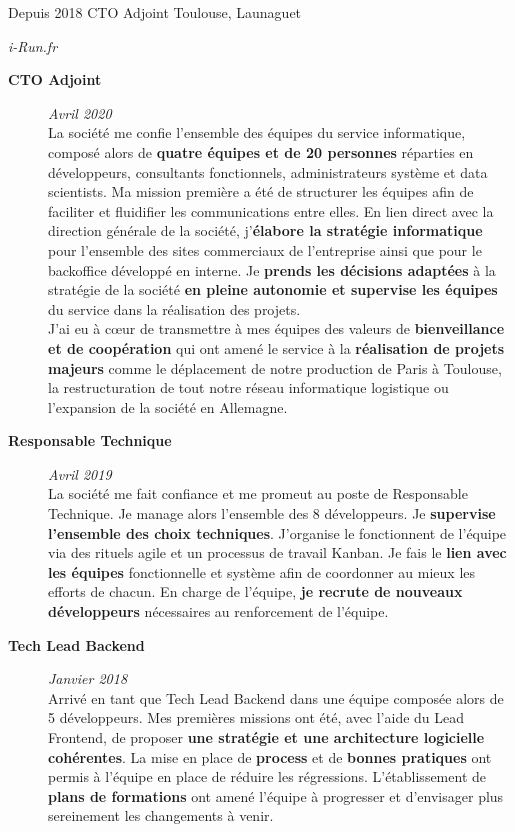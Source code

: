 \documentclass{friggeri-cv} 	%
\begin{document}
\begin{entrylist}
\entry
{Depuis 2018}
{CTO Adjoint}
{Toulouse, Launaguet}
{\vspace{-0.2cm}\emph{i-Run.fr} \\

\begin{description}
    \item [\bodyfont{|} \normalfont \textbf{\color{orange}CTO \color{headercolor}Adjoint}] \hfill \textit{Avril 2020}\\
    La société me confie l’ensemble des équipes du service informatique, composé alors de \textbf{quatre équipes et de 20 personnes} réparties en développeurs, consultants fonctionnels, administrateurs système et data scientists. Ma mission première a été de structurer les équipes afin de faciliter et fluidifier les communications entre elles. En lien direct avec la direction générale de la société, j’\textbf{élabore la stratégie informatique} pour l’ensemble des sites commerciaux de l’entreprise ainsi que pour le backoffice développé en interne. Je \textbf{prends les décisions adaptées} à la stratégie de la société \textbf{en pleine autonomie et supervise les équipes} du service dans la réalisation des projets.\\
    J’ai eu à c\oe{ur} de transmettre à mes équipes des valeurs de \textbf{bienveillance et de coopération} qui ont amené le service à la \textbf{réalisation de projets majeurs} comme le déplacement de notre production de Paris à Toulouse, la restructuration de tout notre réseau informatique logistique ou l’expansion de la société en Allemagne.
    \item [\bodyfont{|} \normalfont \textbf{\color{orange}Responsable \color{headercolor}Technique}] \hfill \textit{Avril 2019}\\
    La société me fait confiance et me promeut au poste de Responsable Technique. Je manage alors l’ensemble des 8 développeurs. Je \textbf{supervise l’ensemble des choix techniques}. J’organise le fonctionnent de l’équipe via des rituels agile et un processus de travail Kanban. Je fais le \textbf{lien avec les équipes} fonctionnelle et système afin de coordonner au mieux les efforts de chacun. En charge de l’équipe, \textbf{je recrute de nouveaux développeurs} nécessaires au renforcement de l’équipe.
    \item[\bodyfont{|} \normalfont \textbf{\color{orange}Tech \color{headercolor}Lead Backend}] \hfill \textit{Janvier 2018} \\
    Arrivé en tant que Tech Lead Backend dans une équipe composée alors de 5 développeurs. Mes premières missions ont été, avec l’aide du Lead Frontend, de proposer \textbf{une stratégie et une architecture logicielle cohérentes}. La mise en place de \textbf{process} et de \textbf{bonnes pratiques} ont permis à l’équipe en place de réduire les régressions. L’établissement de \textbf{plans de formations} ont amené l’équipe à progresser et d’envisager plus sereinement les changements à venir.
\end{description}
\
}


\end{entrylist}
\end{document}

